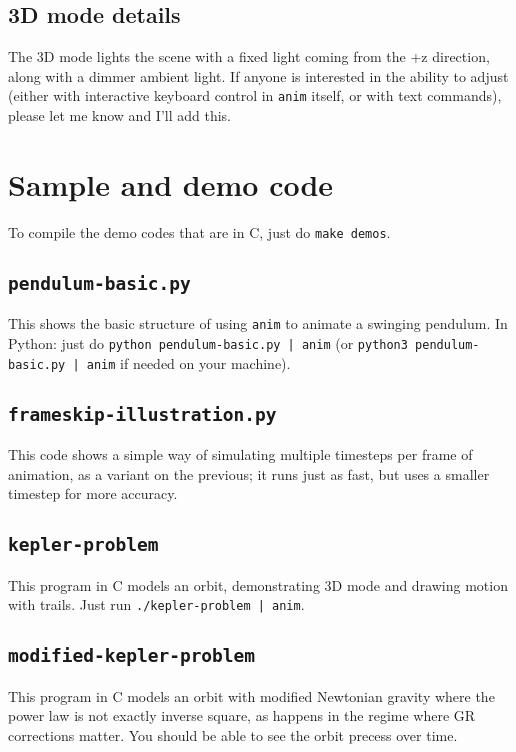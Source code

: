 \documentclass[12pt]{article}
\begin{document}
\subsection{3D mode details}

The 3D mode lights the scene with a fixed light coming from the +z direction, along with a dimmer ambient light. If anyone is interested in the ability to adjust (either with interactive
keyboard control in {\tt anim} itself, or with text commands), please let me know and I'll add this.

\section{Sample and demo code}

To compile the demo codes that are in C, just do {\tt make demos}.

\subsection{\tt pendulum-basic.py}

This shows the basic structure of using {\tt anim} to animate a swinging pendulum. 
In Python: just do {\tt python pendulum-basic.py | anim} (or {\tt python3 pendulum-basic.py | anim} if
needed on your machine).

\subsection{\tt frameskip-illustration.py}

This code shows a simple way of simulating multiple timesteps per frame of animation,
as a variant on the previous; it runs just as fast, but uses a smaller timestep for
more accuracy.

\subsection{\tt kepler-problem}

This program in C models an orbit, demonstrating 3D mode and drawing motion with 
trails. Just run {\tt ./kepler-problem | anim}.

\subsection{\tt modified-kepler-problem}

This program in C models an orbit with modified Newtonian gravity where the power law
is not exactly inverse square, as happens in the regime where GR corrections matter.
You should be able to see the orbit precess over time.
\end{document}
